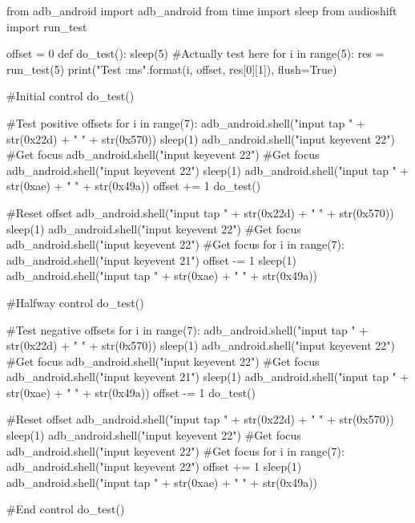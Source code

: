 \begin{mdframed}
    \begin{python}
from adb_android import adb_android
from time import sleep
from audioshift import run_test

offset = 0
def do_test():
    sleep(5)
    #Actually test here
    for i in range(5):
        res = run_test(5)
        print("Test {} {}:{}ms".format(i, offset, res[0][1]), flush=True)

#Initial control
do_test()

#Test positive offsets
for i in range(7):
    adb_android.shell("input tap " + str(0x22d) + " " + str(0x570))
    sleep(1)
    adb_android.shell("input keyevent 22") #Get focus
    adb_android.shell("input keyevent 22") #Get focus
    adb_android.shell("input keyevent 22")
    sleep(1)
    adb_android.shell("input tap " + str(0xae) + " " + str(0x49a))
    offset += 1
    do_test()

#Reset offset
adb_android.shell("input tap " + str(0x22d) + " " + str(0x570))
sleep(1)
adb_android.shell("input keyevent 22") #Get focus
adb_android.shell("input keyevent 22") #Get focus
for i in range(7):
    adb_android.shell("input keyevent 21")
    offset -= 1
sleep(1)
adb_android.shell("input tap " + str(0xae) + " " + str(0x49a))

#Halfway control
do_test()

#Test negative offsets
for i in range(7):
    adb_android.shell("input tap " + str(0x22d) + " " + str(0x570))
    sleep(1)
    adb_android.shell("input keyevent 22") #Get focus
    adb_android.shell("input keyevent 22") #Get focus
    adb_android.shell("input keyevent 21")
    sleep(1)
    adb_android.shell("input tap " + str(0xae) + " " + str(0x49a))
    offset -= 1
    do_test()

#Reset offset
adb_android.shell("input tap " + str(0x22d) + " " + str(0x570))
sleep(1)
adb_android.shell("input keyevent 22") #Get focus
adb_android.shell("input keyevent 22") #Get focus
for i in range(7):
    adb_android.shell("input keyevent 22")
    offset += 1
sleep(1)
adb_android.shell("input tap " + str(0xae) + " " + str(0x49a))

#End control
do_test()
    \end{python}
    \label{ampme_manualoffset}
\end{mdframed}
\clearpage

